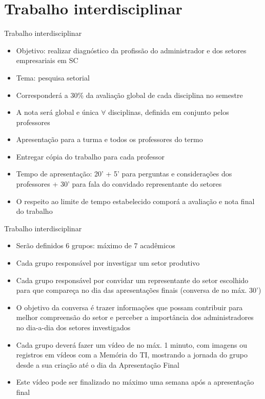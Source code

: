 \documentclass[10pt]{beamer}
\begin{document}
\section{Trabalho interdisciplinar}
\begin{frame}
    {Trabalho interdisciplinar}
    \begin{itemize}
        \item Objetivo: realizar diagnóstico da profissão do administrador e dos setores empresariais em SC\medskip
        \item Tema: pesquisa setorial\medskip
        \item Corresponderá a 30\% da avaliação global de cada disciplina no semestre\medskip
        \item A nota será global e única $\forall$ disciplinas, definida em conjunto pelos professores\medskip
        \item Apresentação para a turma e todos os professores do termo\medskip
        \item Entregar cópia do trabalho para cada professor\medskip
        \item Tempo de apresentação: 20' + 5' para perguntas e considerações dos professores + 30' para fala do convidado representante do setores\medskip
        \item {} O respeito ao limite de tempo estabelecido comporá a avaliação e nota final do trabalho
    \end{itemize}
\end{frame}
\begin{frame}
    {Trabalho interdisciplinar}
    \begin{itemize}
        \item Serão definidos 6 grupos: máximo de 7 acadêmicos\medskip
        \item Cada grupo responsável por investigar um setor produtivo\medskip
        \item Cada grupo responsável por convidar um representante do setor escolhido para que compareça no dia das apresentações finais (conversa de no máx. 30')\medskip
        \item O objetivo da conversa é trazer informações que possam contribuir para melhor compreensão do setor e perceber a importância dos administradores no dia-a-dia dos setores investigados\medskip
        \item Cada grupo deverá fazer um vídeo de no máx. 1 minuto, com imagens ou registros em vídeos com a Memória do TI, mostrando a jornada do grupo desde a sua criação até o dia da Apresentação Final\medskip
        \item Este vídeo pode ser finalizado no máximo uma semana após a apresentação final
    \end{itemize}
\end{frame}
\end{document}
